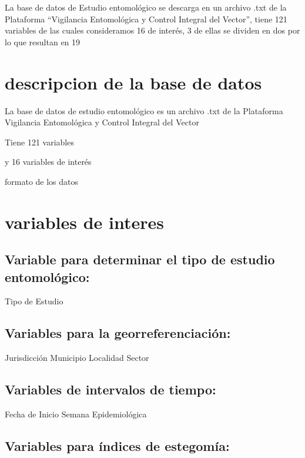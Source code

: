 \documentclass[
  letterpaper,
  twocolumn,
  landscape]{report}
\begin{document}
La base de datos de Estudio entomológico se descarga en un archivo .txt
de la Plataforma ``Vigilancia Entomológica y Control Integral del
Vector'', tiene 121 variables de las cuales consideramos 16 de interés,
3 de ellas se dividen en dos por lo que resultan en 19

\section{descripcion de la base de
datos}\label{descripcion-de-la-base-de-datos}

La base de datos de estudio entomológico es un archivo .txt de la
Plataforma Vigilancia Entomológica y Control Integral del Vector

Tiene 121 variables

y 16 variables de interés

formato de los datos

\section{variables de interes}\label{variables-de-interes}

\subsection{Variable para determinar el tipo de estudio
entomológico:}\label{variable-para-determinar-el-tipo-de-estudio-entomoluxf3gico}

Tipo de Estudio

\subsection{Variables para la
georreferenciación:}\label{variables-para-la-georreferenciaciuxf3n}

Jurisdicción Municipio Localidad Sector

\subsection{Variables de intervalos de
tiempo:}\label{variables-de-intervalos-de-tiempo}

Fecha de Inicio Semana Epidemiológica

\subsection{Variables para índices de
estegomía:}\label{variables-para-uxedndices-de-estegomuxeda}
\end{document}
